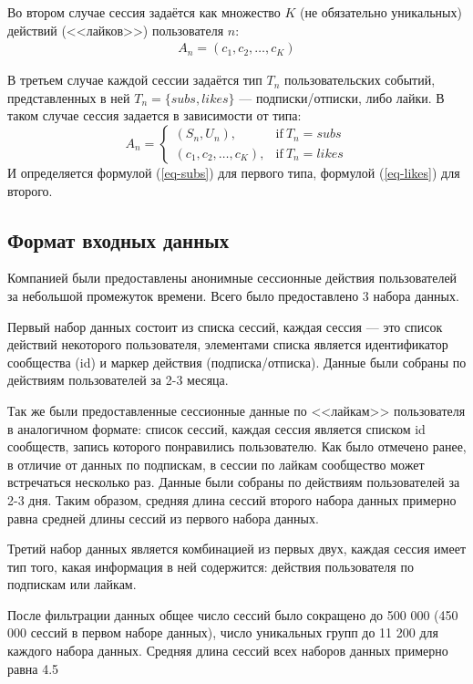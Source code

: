 \documentclass[times,specification,annotation]{itmo-student-thesis}
\begin{document}
Во втором случае сессия задаётся как множество $K$ (не обязательно уникальных) действий (<<лайков>>) пользователя $n$:
 \begin{align}
A_n = (c_{1}, c_{2}, \dots, c_{K}) 
\label{eq-likes}
\end{align}
 
В третьем случае каждой сессии задаётся тип $T_n$ пользовательских событий, представленных в ней $T_n = \{subs, likes\}$ --- подписки/отписки, либо лайки. В таком случае сессия задается в зависимости от типа:
\begin{equation}
    A_n =
    \begin{cases}
      (S_n, U_n), & \text{if}\ T_n=subs \\
      (c_{1}, c_{2}, \dots, c_{K}), & \text{if}\ T_n=likes
    \end{cases}  
    \label{eq-combined}
  \end{equation}
 И определяется формулой (\ref{eq-subs}) для первого типа, формулой (\ref{eq-likes}) для второго.

\subsection{Формат входных данных}

Компанией были предоставлены анонимные сессионные действия пользователей за небольшой промежуток времени. Всего было предоставлено 3 набора данных.

Первый набор данных состоит из списка сессий, каждая сессия --- это список действий некоторого пользователя, элементами списка является идентификатор сообщества (id) и маркер действия (подписка/отписка). Данные были собраны по действиям пользователей за 2-3 месяца.

Так же были предоставленные сессионные данные по <<лайкам>> пользователя в аналогичном формате: список сессий, каждая сессия является списком id сообществ, запись которого понравились пользователю. Как было отмечено ранее, в отличие от данных по подпискам, в сессии по лайкам сообщество может встречаться несколько раз. Данные были собраны по действиям пользователей за 2-3 дня. Таким образом, средняя длина сессий второго набора данных примерно равна средней длины сессий из первого набора данных. 

Третий набор данных является комбинацией из первых двух, каждая сессия имеет тип того, какая информация в ней содержится: действия пользователя по подпискам или лайкам. 

После фильтрации данных общее число сессий было сокращено до 500 000 (450 000 сессий в первом наборе данных), число уникальных групп до 11 200 для каждого набора данных. Средняя длина сессий всех наборов данных примерно равна 4.5
\end{document}
